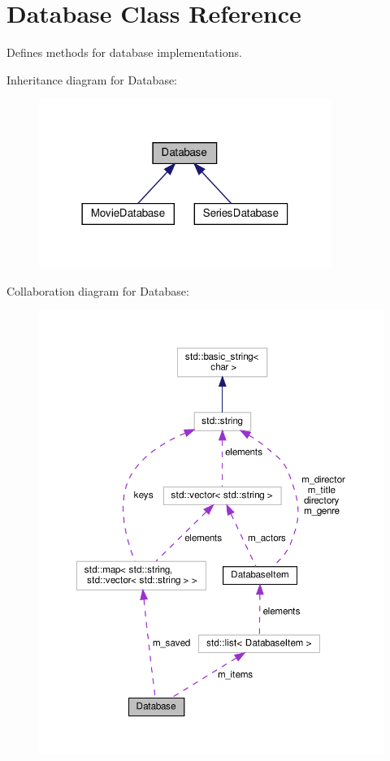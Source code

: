 \hypertarget{classDatabase}{}\section{Database Class Reference}
\label{classDatabase}


Defines methods for database implementations.  




Inheritance diagram for Database\+:\nopagebreak
\begin{figure}[H]
\begin{center}
\leavevmode
\includegraphics[width=270pt]{classDatabase__inherit__graph}
\end{center}
\end{figure}


Collaboration diagram for Database\+:\nopagebreak
\begin{figure}[H]
\begin{center}
\leavevmode
\includegraphics[width=350pt]{classDatabase__coll__graph}
\end{center}
\end{figure}
